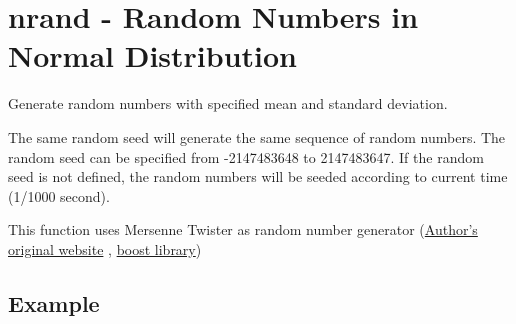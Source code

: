 
%

\section{nrand - Random Numbers in Normal Distribution\label{sect:nrand}}
Generate random numbers with specified mean and standard deviation. 

The same random seed will generate the same sequence of random numbers. The random seed can be specified from -2147483648 to 2147483647. If the random seed is not defined, the random numbers will be seeded according to current time (1/1000 second). 

This function uses Mersenne Twister as random number generator (\href{http://www.math.sci.hiroshima-u.ac.jp/~m-mat/MT/emt.html}{Author’s original website}
, \href{http://www.boost.org/doc/libs/1_54_0/doc/html/boost_random.html}{boost library})


\subsection*{Example}


